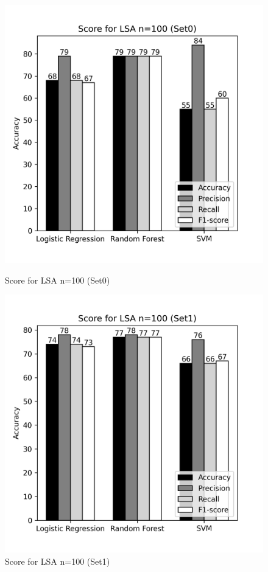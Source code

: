 \documentclass[12pt]{report}
\begin{document}
            \begin{figure}[h]
                \begin{minipage}{0.48\textwidth}
                  \centering
                  \includegraphics[scale=0.55]{plots/Score for LSA n=100 (Set0).png}
                  \caption{Score for LSA n=100 (Set0)}\label{Fig:typo1}
                \end{minipage}\hfill
                \begin{minipage}{0.48\textwidth}
                  \centering
                  \includegraphics[scale=0.55]{plots/Score for LSA n=100 (Set1).png}
                  \caption{Score for LSA n=100 (Set1)}\label{Fig:tyo2}
                \end{minipage}
             \end{figure}
\end{document}
